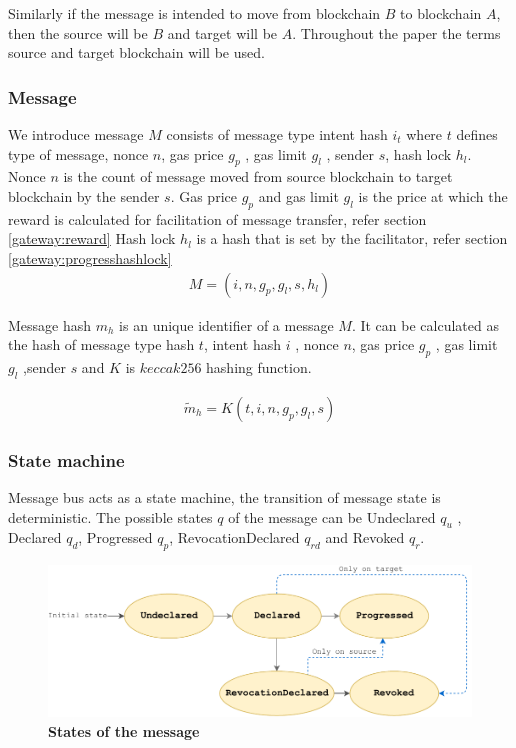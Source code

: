 \documentclass[12pt,a4paper]{article}
\begin{document}
Similarly if the message is intended to move from blockchain $B$ to blockchain $A$, then the source will be $B$ and target will be $A$.
Throughout the paper the terms source and target blockchain will be used.

\subsubsection{Message}\label{gateway:message}
We introduce message $M$ consists of message type intent hash $i_t$ where $t$ defines type of message, nonce $n$, gas price $g_p$ , gas limit $g_l$ , sender $s$, hash lock $h_l$. 
Nonce $n$ is the count of message moved from source blockchain to target blockchain by the sender $s$. 
Gas price $g_p$ and gas limit $g_l$  is the price at which the reward is calculated for facilitation of message transfer, refer section \ref{gateway:reward}  
Hash lock $h_l$ is a hash that is set by the facilitator, refer section \ref{gateway:progresshashlock} 
\begin{align}
  M = (i, n, g_p, g_l, s, h_l) 
\end{align}

Message hash $m_h$ is an unique identifier of a message $M$. It can be calculated as the hash of message type hash $t$, intent hash $i$ , nonce $n$, gas price $g_p$ , gas limit $g_l$ ,sender $s$ and $K$ is $keccak256$ hashing function. 
     
     \begin{align}
     	\tilde{m}_h = K(t, i, n, g_p, g_l, s) 
     \end{align} 

\subsubsection{State machine}\label{gateway:statemachine} 
Message bus acts as a state machine, the transition of message state is deterministic. 
The possible states $q$ of the message can be Undeclared $q_u$ , Declared $q_d$, Progressed $q_p$, RevocationDeclared $q_{rd}$  and Revoked $q_r$. 
\begin{figure}[htb]
    \centering
	\includegraphics[width=\textwidth]{state_diagram}
	\caption{\textbf{States of the message}}
	\label{fig:state_diagram}
\end{figure}
\end{document}
